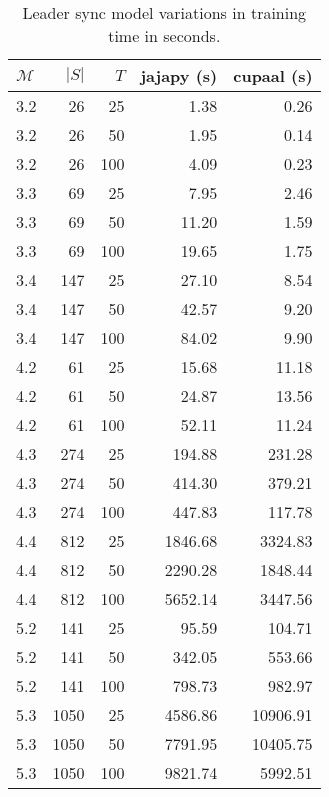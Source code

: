\begin{table}
    \centering
    \caption{Leader sync model variations in training time in seconds.}
    \label{tab:leader_results}
    \begin{tabular}{lrrrr}
        \toprule
        $\mathcal{M}$ & $|S|$ & $T$ & jajapy (s) & cupaal (s) \\
        \midrule
        3.2           & 26    & 25  & 1.38       & 0.26       \\
        3.2           & 26    & 50  & 1.95       & 0.14       \\
        3.2           & 26    & 100 & 4.09       & 0.23       \\
        3.3           & 69    & 25  & 7.95       & 2.46       \\
        3.3           & 69    & 50  & 11.20      & 1.59       \\
        3.3           & 69    & 100 & 19.65      & 1.75       \\
        3.4           & 147   & 25  & 27.10      & 8.54       \\
        3.4           & 147   & 50  & 42.57      & 9.20       \\
        3.4           & 147   & 100 & 84.02      & 9.90       \\
        4.2           & 61    & 25  & 15.68      & 11.18      \\
        4.2           & 61    & 50  & 24.87      & 13.56      \\
        4.2           & 61    & 100 & 52.11      & 11.24      \\
        4.3           & 274   & 25  & 194.88     & 231.28     \\
        4.3           & 274   & 50  & 414.30     & 379.21     \\
        4.3           & 274   & 100 & 447.83     & 117.78     \\
        4.4           & 812   & 25  & 1846.68    & 3324.83    \\
        4.4           & 812   & 50  & 2290.28    & 1848.44    \\
        4.4           & 812   & 100 & 5652.14    & 3447.56    \\
        5.2           & 141   & 25  & 95.59      & 104.71     \\
        5.2           & 141   & 50  & 342.05     & 553.66     \\
        5.2           & 141   & 100 & 798.73     & 982.97     \\
        5.3           & 1050  & 25  & 4586.86    & 10906.91   \\
        5.3           & 1050  & 50  & 7791.95    & 10405.75   \\
        5.3           & 1050  & 100 & 9821.74    & 5992.51    \\
        \bottomrule
    \end{tabular}
\end{table}


